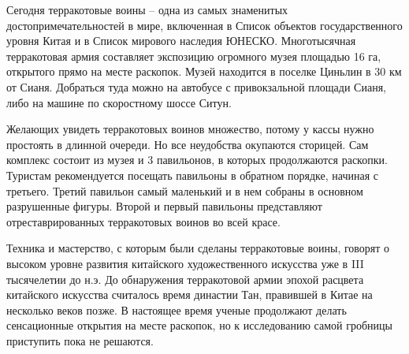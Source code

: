 Сегодня терракотовые воины – одна из самых знаменитых достопримечательностей в мире, включенная в Список объектов государственного уровня Китая и в Список мирового наследия ЮНЕСКО. Многотысячная терракотовая армия составляет экспозицию огромного музея площадью 16 га, открытого прямо на месте раскопок. Музей находится в поселке Циньлин в 30 км от Сианя. Добраться туда можно на автобусе с привокзальной площади Сианя, либо на машине по скоростному шоссе Ситун.

Желающих увидеть терракотовых воинов множество, потому у кассы нужно простоять в длинной очереди. Но все неудобства окупаются сторицей. Сам комплекс состоит из музея и 3 павильонов, в которых продолжаются раскопки. Туристам рекомендуется посещать павильоны в обратном порядке, начиная с третьего. Третий павильон самый маленький и в нем собраны в основном разрушенные фигуры. Второй и первый павильоны представляют отреставрированных терракотовых воинов во всей красе.

Техника и мастерство, с которым были сделаны терракотовые воины, говорят о высоком уровне развития китайского художественного искусства уже в III тысячелетии до н.э. До обнаружения терракотовой армии эпохой расцвета китайского искусства считалось время династии Тан, правившей в Китае на несколько веков позже. В настоящее время ученые продолжают делать сенсационные открытия на месте раскопок, но к исследованию самой гробницы приступить пока не решаются.